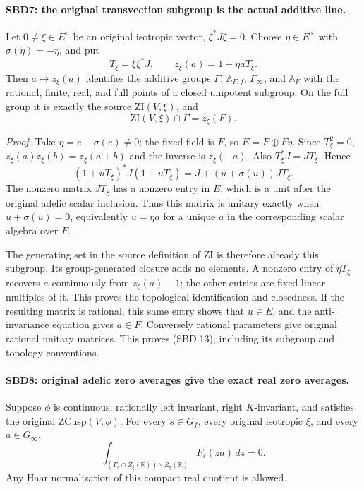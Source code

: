 \documentclass[11pt,a4paper]{article}
\numberwithin{equation}{section}
\theoremstyle{remark}\newtheorem{remark}[theorem]{Remark}
\begin{document}
\paragraph{SBD7: the original transvection subgroup is the actual additive line.}
\label{claim:SBD7}
Let \(0\ne\xi\in E^n\) be an original isotropic vector,
\(\xi^*J\xi=0\).  Choose \(\eta\in E^\times\) with
\(\sigma(\eta)=-\eta\), and put
\[
 T_\xi=\xi\xi^*J,\qquad
 z_\xi(a)=1+\eta a T_\xi.
 \tag{SBD.12}
\]
Then \(a\mapsto z_\xi(a)\) identifies the additive groups
\(F\), \(\mathbb A_{F,f}\), \(F_\infty\), and \(\mathbb A_F\)
with the rational, finite, real, and full points of a closed
unipotent subgroup.  On the full group it is exactly the source
\(\mathrm{ZI}(V,\xi)\), and
\[
       \mathrm{ZI}(V,\xi)\cap\Gamma=z_\xi(F).
 \tag{SBD.13}
\]

\emph{Proof.}
Take \(\eta=e-\sigma(e)\ne0\); the fixed field is \(F\), so
\(E=F\oplus F\eta\).  Since \(T_\xi^2=0\),
\(z_\xi(a)z_\xi(b)=z_\xi(a+b)\) and the inverse is
\(z_\xi(-a)\).  Also \(T_\xi^*J=JT_\xi\).  Hence
\[
 (1+uT_\xi)^*J(1+uT_\xi)
      =J+(u+\sigma(u))JT_\xi.
 \tag{SBD.14}
\]
The nonzero matrix \(JT_\xi\) has a nonzero entry in \(E\),
which is a unit after the original adelic scalar inclusion.
Thus this matrix is unitary exactly when
\(u+\sigma(u)=0\), equivalently \(u=\eta a\) for a unique
\(a\) in the corresponding scalar algebra over \(F\).

The generating set in the source definition of \(\mathrm{ZI}\)
is therefore already this subgroup.  Its group-generated closure
adds no elements.  A nonzero entry of \(\eta T_\xi\) recovers
\(a\) continuously from \(z_\xi(a)-1\); the other entries are
fixed linear multiples of it.  This proves the topological
identification and closedness.  If the resulting matrix is
rational, this same entry shows that \(u\in E\), and the
anti-invariance equation gives \(a\in F\).  Conversely rational
parameters give original rational unitary matrices.  This proves
(SBD.13), including its subgroup and topology conventions.

\paragraph{SBD8: original adelic zero averages give the exact real zero averages.}
\label{claim:SBD8}
Suppose \(\phi\) is continuous, rationally left invariant,
right \(K\)-invariant, and satisfies the original
\(\mathrm{ZCusp}(V,\phi)\).  For every \(s\in G_f\), every
original isotropic \(\xi\), and every \(a\in G_\infty\),
\[
 \int_{(\Gamma_s\cap Z_\xi(\mathbb R))\backslash
                  Z_\xi(\mathbb R)} F_s(za)\,dz=0.
 \tag{SBD.15}
\]
Any Haar normalization of this compact real quotient is allowed.
\end{document}
